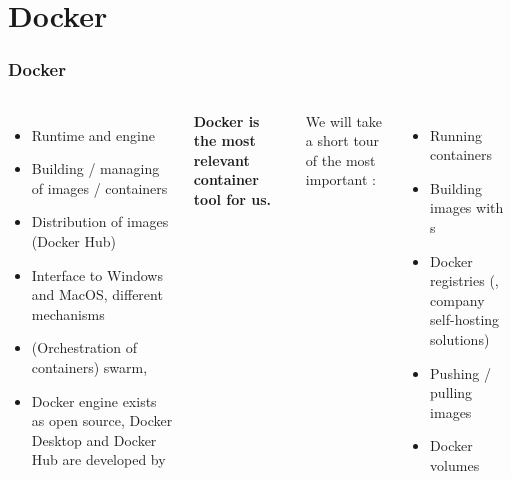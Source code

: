 \section{Docker}
\begin{frame}
	\frametitle{Docker}
	
	\begin{columns}
		\begin{itemize}
			\item Runtime and engine
			\item Building / managing of images / containers
			\item Distribution of images (Docker Hub)
			\item Interface to Windows and MacOS, different mechanisms
			\item (Orchestration of containers) swarm, 
			\item Docker engine exists as open source, Docker Desktop and Docker Hub are developed by 
		\end{itemize}
		\textbf{Docker is the most relevant container tool for us.}
		
		\vspace{.2cm}We will take a short tour of the most important :
		\begin{itemize}
			\item Running containers
			\item Building images with s
			\item Docker registries (, company self-hosting solutions)
			\item Pushing / pulling images
			\item Docker volumes
		\end{itemize}
	\end{columns}
	
\end{frame}

